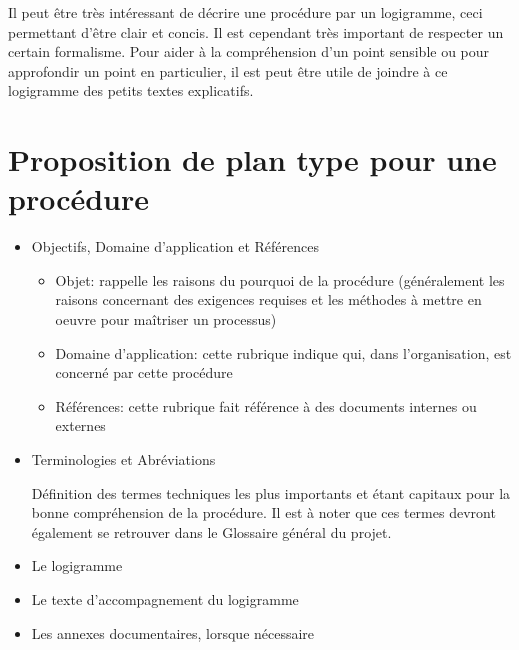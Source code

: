 \documentclass[a4paper]{article}
\begin{document}

Il peut être très intéressant de décrire une procédure par un logigramme, ceci permettant d'être clair et concis. Il est cependant très important de respecter un certain formalisme. Pour aider à la compréhension d'un point sensible ou pour approfondir un point en particulier, il est peut être utile de joindre à ce logigramme des petits textes explicatifs.


\section{Proposition de plan type pour une procédure}

\begin{itemize}
\item Objectifs, Domaine d'application et Références

\begin{itemize}
\item Objet: rappelle les raisons du pourquoi de la procédure (généralement les raisons concernant des exigences requises et les méthodes à mettre en oeuvre pour maîtriser un processus)
\item Domaine d'application: cette rubrique indique qui, dans l'organisation, est concerné par cette procédure
\item Références: cette rubrique fait référence à des documents internes ou externes
\end{itemize}

\item Terminologies et Abréviations

Définition des termes techniques les plus importants et étant capitaux pour la bonne compréhension de la procédure. Il est à noter que ces termes devront également se retrouver dans le Glossaire général du projet.

\item Le logigramme
\item Le texte d'accompagnement du logigramme
\item Les annexes documentaires, lorsque nécessaire
\end{itemize}

\end{document}
